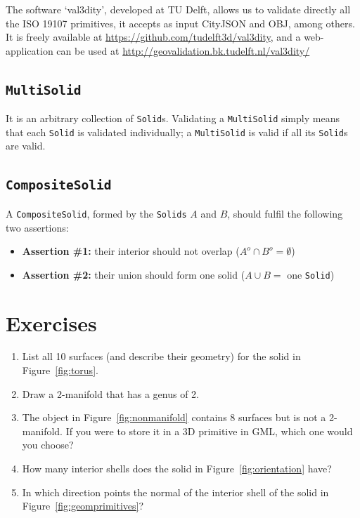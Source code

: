 \begin{kaobox}[frametitle=\faCog\ How does it work in practice?]
  The software `val3dity', developed at TU Delft, allows us to validate directly all the ISO 19107 primitives, it accepts as input CityJSON and OBJ, among others.
  It is freely available at \url{https://github.com/tudelft3d/val3dity}, and a web-application can be used at \url{http://geovalidation.bk.tudelft.nl/val3dity/}
\end{kaobox}

\subsection{\texttt{MultiSolid}}
It is an arbitrary collection of \texttt{Solid}s.
Validating a \texttt{MultiSolid} simply means that each \texttt{Solid} is validated individually; a \texttt{MultiSolid} is valid if all its \texttt{Solid}s are valid.


\subsection{\texttt{CompositeSolid}}
A \texttt{CompositeSolid}, formed by the \texttt{Solids} $A$ and $B$, should fulfil the following two assertions:
\begin{itemize}
  \item \textbf{Assertion \#1:} their interior should not overlap ($A^{o} \cap B^{o} = \emptyset$)
  \item \textbf{Assertion \#2:} their union should form one solid ($A \cup B =$ one \texttt{Solid})
\end{itemize}



%
\section{Exercises}

\begin{enumerate}
  \item List all 10 surfaces (and describe their geometry) for the solid in Figure~\ref{fig:torus}.
  \item Draw a 2-manifold that has a genus of 2.
  \item The object in Figure~\ref{fig:nonmanifold} contains 8 surfaces but is not a 2-manifold. If you were to store it in a 3D primitive in GML, which one would you choose? 
  \item How many interior shells does the solid in Figure~\ref{fig:orientation} have?
  \item In which direction points the normal of the interior shell of the solid in Figure~\ref{fig:geomprimitives}?
\end{enumerate}



